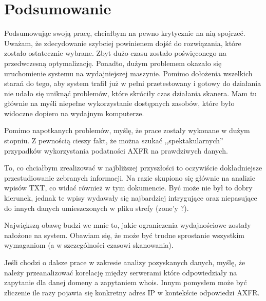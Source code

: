 \section{Podsumowanie}

Podsumowując swoją pracę, chciałbym na pewno krytycznie na nią spojrzeć. Uważam, że zdecydowanie szybciej powinienem dojść do rozwiązania, które zostało ostatecznie wybrane. Zbyt dużo czasu zostało poświęconego na przedwczesną optymalizację. Ponadto, dużym problemem okazało się uruchomienie systemu na wydajniejszej maszynie. Pomimo dołożenia wszelkich starań do tego, aby system trafił już w pełni przetestowany i gotowy do działania nie udało się uniknąć problemów, które skróciły czas działania skanera. Mam tu głównie na myśli niepełne wykorzystanie dostępnych zasobów, które było widoczne dopiero na wydajnym komputerze.

Pomimo napotkanych problemów, myślę, że prace zostały wykonane w dużym stopniu. Z pewnością cieszy fakt, że można szukać ,,spektakularnych'' przypadków wykorzystania podatności AXFR na prawdziwych danych. 

To, co chciałbym zrealizować w najbliższej przyszłości to oczywiście dokładniejsze przestudiowanie zebranych informacji. Na razie skupiono się głównie na analizie wpisów TXT, co widać również w tym dokumencie. Być może nie był to dobry kierunek, jednak te wpisy wydawały się najbardziej intrygujące oraz niepasujące do innych danych umieszczonych w pliku strefy (zone'y ?).

Największą obawę budzi we mnie to, jakie ograniczenia wydajnościowe zostały nałożone na system. Obawiam się, że może być trudne sprostanie wszystkim wymaganiom (a w szczególności czasowi skanowania).

Jeśli chodzi o dalsze prace w zakresie analizy pozyskanych danych, myślę, że należy przeanalizować korelację między serwerami które odpowiedziały na zapytanie dla danej domeny a zapytaniem whois. Innym pomysłem może być zliczenie ile razy pojawia się konkretny adres IP w kontekście odpowiedzi AXFR.